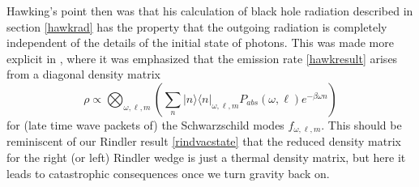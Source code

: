 \documentclass[12pt]{article}
\newcommand{\be}{\begin{equation}}
\newcommand{\ee}{\end{equation}}
\newcommand{\lan}{\langle}
\newcommand{\ran}{\rangle}
\begin{document}
Hawking's point then was that his calculation of black hole radiation described in section \ref{hawkrad} has the property that the outgoing radiation is completely independent of the details of the initial state of photons.  This was made more explicit in \cite{Wald:1975kc}, where it was emphasized that the emission rate \eqref{hawkresult} arises from a diagonal density matrix 
\be\label{waldform}
\rho\propto \bigotimes_{\omega,\ell,m}\left(\sum_n |n\ran\lan n|_{\omega,\ell,m}P_{abs}(\omega,\ell)e^{-\beta \omega n}\right)
\ee
for (late time wave packets of) the Schwarzschild modes $f_{\omega,\ell,m}$.  This should be reminiscent of our Rindler result \eqref{rindvacstate} that the reduced density matrix for the right (or left) Rindler wedge is just a thermal density matrix, but here it leads to catastrophic consequences once we turn gravity back on.  
\end{document}
